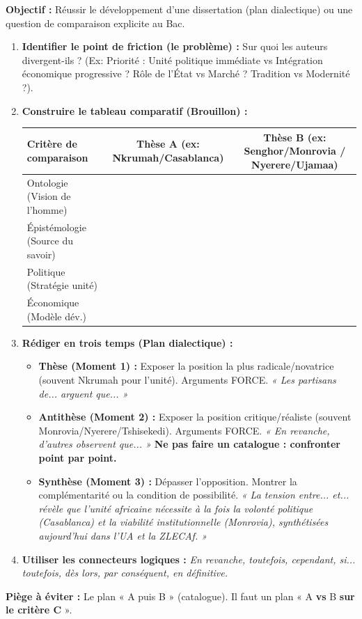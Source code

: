 \documentclass[11pt]{article}
\begin{document}
\begin{methode}
\textbf{Objectif :} Réussir le développement d'une dissertation (plan dialectique) ou une question de comparaison explicite au Bac.
\begin{enumerate}
    \item \textbf{Identifier le point de friction (le problème) :} Sur quoi les auteurs divergent-ils ? (Ex: Priorité : Unité politique immédiate vs Intégration économique progressive ? Rôle de l'État vs Marché ? Tradition vs Modernité ?).
    \item \textbf{Construire le tableau comparatif (Brouillon) :}
    \begin{center}
    \begin{tabular}{|l|c|c|}\hline
    \rowcolor{popblueL} \textbf{Critère de comparaison} & \textbf{Thèse A (ex: Nkrumah/Casablanca)} & \textbf{Thèse B (ex: Senghor/Monrovia / Nyerere/Ujamaa)} \\ \hline
    Ontologie (Vision de l'homme) & & \\ \hline
    Épistémologie (Source du savoir) & & \\ \hline
    Politique (Stratégie unité) & & \\ \hline
    Économique (Modèle dév.) & & \\ \hline
    \end{tabular}
    \end{center}
    \item \textbf{Rédiger en trois temps (Plan dialectique) :}
        \begin{itemize}
            \item \textbf{Thèse (Moment 1) :} Exposer la position la plus radicale/novatrice (souvent Nkrumah pour l'unité). Arguments FORCE. \emph{« Les partisans de... arguent que... »}
            \item \textbf{Antithèse (Moment 2) :} Exposer la position critique/réaliste (souvent Monrovia/Nyerere/Tshisekedi). Arguments FORCE. \emph{« En revanche, d'autres observent que... »} \textbf{Ne pas faire un catalogue : confronter point par point.}
            \item \textbf{Synthèse (Moment 3) :} Dépasser l'opposition. Montrer la complémentarité ou la condition de possibilité. \emph{« La tension entre... et... révèle que l'unité africaine nécessite à la fois la volonté politique (Casablanca) et la viabilité institutionnelle (Monrovia), synthétisées aujourd'hui dans l'UA et la ZLECAf. »}
        \end{itemize}
    \item \textbf{Utiliser les connecteurs logiques :} \emph{En revanche, toutefois, cependant, si... toutefois, dès lors, par conséquent, en définitive.}
\end{enumerate}
\textbf{Piège à éviter :} Le plan « A puis B » (catalogue). Il faut un plan « A \textbf{vs} B \textbf{sur le critère C} ».
\end{methode}
\end{document}
